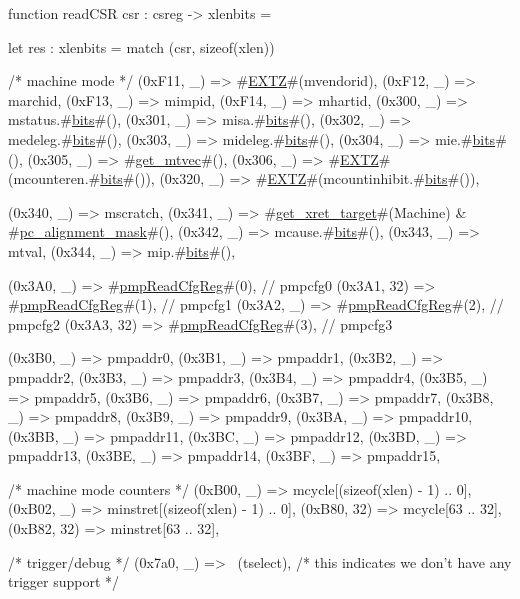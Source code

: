 function readCSR csr : csreg -> xlenbits = {
  let res : xlenbits =
  match (csr, sizeof(xlen)) {
    /* machine mode */
    (0xF11,  _) => #\hyperref[sailRISCVzEXTZ]{EXTZ}#(mvendorid),
    (0xF12,  _) => marchid,
    (0xF13,  _) => mimpid,
    (0xF14,  _) => mhartid,
    (0x300,  _) => mstatus.#\hyperref[sailRISCVzbits]{bits}#(),
    (0x301,  _) => misa.#\hyperref[sailRISCVzbits]{bits}#(),
    (0x302,  _) => medeleg.#\hyperref[sailRISCVzbits]{bits}#(),
    (0x303,  _) => mideleg.#\hyperref[sailRISCVzbits]{bits}#(),
    (0x304,  _) => mie.#\hyperref[sailRISCVzbits]{bits}#(),
    (0x305,  _) => #\hyperref[sailRISCVzgetzymtvec]{get\_mtvec}#(),
    (0x306,  _) => #\hyperref[sailRISCVzEXTZ]{EXTZ}#(mcounteren.#\hyperref[sailRISCVzbits]{bits}#()),
    (0x320,  _) => #\hyperref[sailRISCVzEXTZ]{EXTZ}#(mcountinhibit.#\hyperref[sailRISCVzbits]{bits}#()),

    (0x340,  _) => mscratch,
    (0x341,  _) => #\hyperref[sailRISCVzgetzyxretzytarget]{get\_xret\_target}#(Machine) & #\hyperref[sailRISCVzpczyalignmentzymask]{pc\_alignment\_mask}#(),
    (0x342,  _) => mcause.#\hyperref[sailRISCVzbits]{bits}#(),
    (0x343,  _) => mtval,
    (0x344,  _) => mip.#\hyperref[sailRISCVzbits]{bits}#(),

    (0x3A0,  _) => #\hyperref[sailRISCVzpmpReadCfgReg]{pmpReadCfgReg}#(0),           // pmpcfg0
    (0x3A1, 32) => #\hyperref[sailRISCVzpmpReadCfgReg]{pmpReadCfgReg}#(1),           // pmpcfg1
    (0x3A2,  _) => #\hyperref[sailRISCVzpmpReadCfgReg]{pmpReadCfgReg}#(2),           // pmpcfg2
    (0x3A3, 32) => #\hyperref[sailRISCVzpmpReadCfgReg]{pmpReadCfgReg}#(3),           // pmpcfg3

    (0x3B0,  _) => pmpaddr0,
    (0x3B1,  _) => pmpaddr1,
    (0x3B2,  _) => pmpaddr2,
    (0x3B3,  _) => pmpaddr3,
    (0x3B4,  _) => pmpaddr4,
    (0x3B5,  _) => pmpaddr5,
    (0x3B6,  _) => pmpaddr6,
    (0x3B7,  _) => pmpaddr7,
    (0x3B8,  _) => pmpaddr8,
    (0x3B9,  _) => pmpaddr9,
    (0x3BA,  _) => pmpaddr10,
    (0x3BB,  _) => pmpaddr11,
    (0x3BC,  _) => pmpaddr12,
    (0x3BD,  _) => pmpaddr13,
    (0x3BE,  _) => pmpaddr14,
    (0x3BF,  _) => pmpaddr15,

    /* machine mode counters */
    (0xB00,  _) => mcycle[(sizeof(xlen) - 1) .. 0],
    (0xB02,  _) => minstret[(sizeof(xlen) - 1) .. 0],
    (0xB80, 32) => mcycle[63 .. 32],
    (0xB82, 32) => minstret[63 .. 32],

    /* trigger/debug */
    (0x7a0,  _) => ~(tselect),  /* this indicates we don't have any trigger support */

}}
